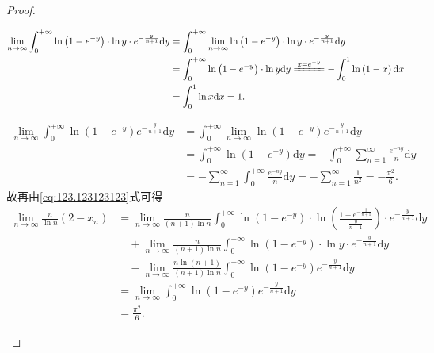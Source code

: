\documentclass[../../main.tex]{subfiles}%
\begin{document}
\begin{proof}
\begin{enumerate}[(1)]
\begin{align*}
\lim\limits_{n\rightarrow \infty}\int_0^{+\infty} \ln \left( 1-e^{-y} \right) \cdot \ln y\cdot e^{-\frac{y}{n+1}}\mathrm{d}y&=\int_0^{+\infty} \lim\limits_{n\rightarrow \infty}\ln \left( 1-e^{-y} \right) \cdot \ln y\cdot e^{-\frac{y}{n+1}}\mathrm{d}y\\
&=\int_0^{+\infty} \ln \left( 1-e^{-y} \right) \cdot \ln y\mathrm{d}y\xlongequal{x=e^{-y}}-\int_0^1 \ln \left( 1-x \right) \mathrm{d}x\\
&=\int_0^1 \ln x\mathrm{d}x=1.
\end{align*}

\begin{align*}
\lim\limits_{n\rightarrow \infty}\int_0^{+\infty} \ln \left( 1-e^{-y} \right) e^{-\frac{y}{n+1}}\mathrm{d}y&=\int_0^{+\infty} \lim\limits_{n\rightarrow \infty}\ln \left( 1-e^{-y} \right) e^{-\frac{y}{n+1}}\mathrm{d}y\\
&=\int_0^{+\infty} \ln \left( 1-e^{-y} \right) \mathrm{d}y=-\int_0^{+\infty} \sum\limits_{n=1}^{\infty} \frac{e^{-ny}}{n}\mathrm{d}y\\
&=-\sum\limits_{n=1}^{\infty} \int_0^{+\infty} \frac{e^{-ny}}{n}\mathrm{d}y=-\sum\limits_{n=1}^{\infty} \frac{1}{n^2}=-\frac{\pi ^2}{6}.
\end{align*}
故再由\eqref{eq:123.123123123}式可得
\begin{align*}
\lim\limits_{n\rightarrow \infty}\frac{n}{\ln n}\left( 2-x_n \right)&=\lim\limits_{n\rightarrow \infty}\frac{n}{\left( n+1 \right) \ln n}\int_0^{+\infty} \ln \left( 1-e^{-y} \right) \cdot \ln \left( \frac{1-e^{-\frac{y}{n+1}}}{\frac{y}{n+1}} \right) \cdot e^{-\frac{y}{n+1}}\mathrm{d}y\\
&\quad +\lim\limits_{n\rightarrow \infty}\frac{n}{\left( n+1 \right) \ln n}\int_0^{+\infty} \ln \left( 1-e^{-y} \right) \cdot \ln y\cdot e^{-\frac{y}{n+1}}\mathrm{d}y\\
&\quad -\lim\limits_{n\rightarrow \infty}\frac{n\ln \left( n+1 \right)}{\left( n+1 \right) \ln n}\int_0^{+\infty} \ln \left( 1-e^{-y} \right) e^{-\frac{y}{n+1}}\mathrm{d}y\\
&=\lim\limits_{n\rightarrow \infty}\int_0^{+\infty} \ln \left( 1-e^{-y} \right) e^{-\frac{y}{n+1}}\mathrm{d}y\\
&=\frac{\pi ^2}{6}.
\end{align*}
\end{enumerate}

\end{proof}
\end{document}
